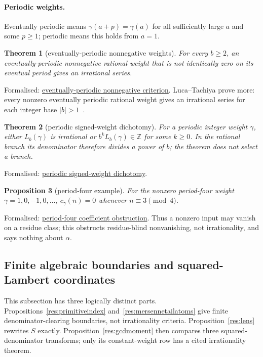 \documentclass[11pt]{article}
\newcommand{\commit}{ebc98ee71f6819bd9fe344a0bb343542c604e533}
\newcommand{\repobase}{https://github.com/wcook04/plectis-lean-erdos249-257/blob/\commit}
\newcommand{\PK}{Erdos249257}
\newcommand{\lword}[4]{\href{\repobase/\PK/#1\#L#2}{#4}}
\newtheorem{theorem}{Theorem}[section]
\newtheorem{proposition}[theorem]{Proposition}
\theoremstyle{definition}
\theoremstyle{remark}
\newcommand{\Z}{\mathbb{Z}}
\begin{document}
{\paragraph{Periodic weights.}\label{sec:periodicweights}
Eventually periodic means $\gamma(a+p)=\gamma(a)$ for all sufficiently large
$a$ and some $p\geq1$; periodic means this holds from $a=1$.
\begin{theorem}[eventually-periodic nonnegative weights]
\label{res:periodicnonnegative}
For every $b\ge2$, an eventually-periodic nonnegative rational weight that is
not identically zero on its eventual period gives an irrational series.
\end{theorem}
\noindent Formalised:
\lword{CertificateKernel.lean}{12483}{irrational_ratWeightSeries_eventuallyPeriodic}{eventually-periodic nonnegative criterion}.
Luca--Tachiya prove more: every nonzero eventually periodic rational weight
gives an irrational series for each integer base $|b|>1$~\cite{lucatachiya}.
\begin{theorem}[periodic signed-weight dichotomy]\label{res:periodicsigned}
For a periodic integer weight \(\gamma\), either \(L_b(\gamma)\) is irrational
or \(b^kL_b(\gamma)\in\Z\) for some \(k\ge0\).  In the rational branch its
denominator therefore divides a power of \(b\); the theorem does not select a branch.
\end{theorem}
\noindent Formalised:
\lword{CertificateKernel.lean}{13847}{irrational_or_bpow_mul_eq_intCast_intWeightedErdosSeries_periodic}{periodic signed-weight dichotomy}.
\begin{proposition}[period-four example]\label{res:periodfourobstruction}
For the nonzero period-four weight \(\gamma=1,0,-1,0,\ldots\),
$c_\gamma(n)=0$ whenever \(n\equiv3\pmod4\).
\end{proposition}
\noindent Formalised:
\lword{CertificateKernel.lean}{13898}{intWeightedCoeff_periodFourSignWeight_eq_zero_of_mod_four_eq_three}{period-four coefficient obstruction}.
Thus a nonzero input may vanish on a residue class; this obstructs residue-blind
nonvanishing, not irrationality, and says nothing about $\alpha$.

\subsection{Finite algebraic boundaries and squared-Lambert coordinates}
\label{app:lambert-algebraic}

This subsection has three logically distinct parts.  Propositions~\ref{res:primitiveindex}
and~\ref{res:mersennetailatoms} give finite denominator-clearing boundaries,
not irrationality criteria.  Proposition~\ref{res:lens} rewrites $S$ exactly.
Proposition~\ref{res:gcdmoment} then compares three squared-denominator transforms;
only its constant-weight row has a cited irrationality theorem.

}
\end{document}
